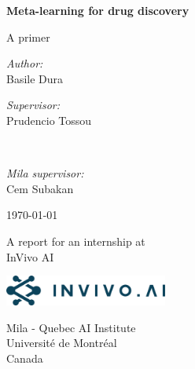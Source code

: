 \documentclass[11pt]{article}
\numberwithin{equation}{subsection}
\begin{document}
\begin{titlepage}
  \begin{center}
    \vspace*{1cm}

    \Huge
    \textbf{Meta-learning for drug discovery}

    \vspace{0.5cm}
    \LARGE
    A primer

    \large

    \vfill
    \vfill

    \emph{Author:} \\
    Basile Dura

    \vfill

    \begin{minipage}{0.4\textwidth}
  		\begin{flushleft} \large
        \emph{Supervisor:} \\
  			Prudencio Tossou
  		\end{flushleft}
  	\end{minipage}~
  	\begin{minipage}{0.4\textwidth}
  		\begin{flushright} \large
        \emph{Mila supervisor:} \\
        Cem Subakan
  		\end{flushright}
  	\end{minipage}



    \vfill

    \today

    \vfill

    A report for an internship at\\
    InVivo AI

    \vspace{0.2cm}

    \includegraphics[width=0.4\textwidth]{invivo}

    \vspace{0.8cm}

    \Large
    Mila - Quebec AI Institute\\
    Université de Montréal\\
    Canada

  \end{center}
\end{titlepage}
\end{document}
